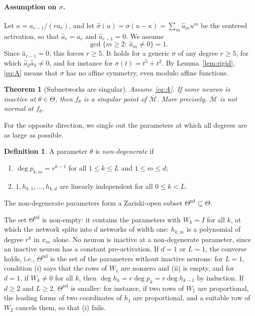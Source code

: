 \documentclass[11pt]{article}
\newtheorem{maintheorem}{Theorem}
\theoremstyle{definition}
\newtheorem{definition}[lemma]{Definition}
\theoremstyle{remark}
\newcommand{\M}{\mathcal{M}}
\newcommand{\Mbar}{\overline{\M}}
\newcommand{\Tn}{\Theta^{\mathrm{nd}}}
\newcommand{\hs}{\hat\sigma}
\newcommand{\ha}{\hat a}
\begin{document}
\paragraph{Assumption on $\sigma$.} Let $\kappa=a_{r-1}/(ra_r)$, and let $\hs(u)=\sigma(u-\kappa)=\sum_m\ha_mu^m$ be the centered activation, so that $\ha_r=a_r$ and $\ha_{r-1}=0$. We assume
\begin{equation*}\tag{A}\label{eq:A}
\gcd\{m\ge2:\ \ha_m\ne0\}=1.
\end{equation*}
Since $\ha_{r-1}=0$, this forces $r\ge5$. It holds for a generic $\sigma$ of any degree $r\ge5$, for which $\ha_2\ha_3\ne0$, and for instance for $\sigma(t)=t^5+t^2$. By Lemma~\ref{lem:rigid}, \eqref{eq:A} means that $\sigma$ has no affine symmetry, even modulo affine functions.

\begin{maintheorem}[Subnetworks are singular]\label{thm:sing}
Assume \eqref{eq:A}. If some neuron is inactive at $\theta\in\Theta$, then $f_\theta$ is a singular point of $\Mbar$. More precisely, $\Mbar$ is not normal at $f_\theta$.
\end{maintheorem}

For the opposite direction, we single out the parameters at which all degrees are as large as possible.

\begin{definition}\label{def:nd}
A parameter $\theta$ is \emph{non-degenerate} if
\begin{enumerate}[label=\textup{(\roman*)},nosep]
\item $\deg p_{k,m}=r^{k-1}$ for all $1\le k\le L$ and $1\le m\le d$;
\item $1,h_{k,1},\dots,h_{k,d}$ are linearly independent for all $0\le k<L$.
\end{enumerate}
The non-degenerate parameters form a Zariski-open subset $\Tn\subseteq\Theta$.
\end{definition}

The set $\Tn$ is non-empty: it contains the parameters with $W_k=I$ for all $k$, at which the network splits into $d$ networks of width one: $h_{k,m}$ is a polynomial of degree $r^k$ in $x_m$ alone. No neuron is inactive at a non-degenerate parameter, since an inactive neuron has a constant pre-activation. If $d=1$ or $L=1$, the converse holds, i.e., $\Tn$ is the set of the parameters without inactive neurons: for $L=1$, condition (i) says that the rows of $W_1$ are nonzero and (ii) is empty, and for $d=1$, if $W_k\ne0$ for all $k$, then $\deg h_k=r\deg p_k=r\deg h_{k-1}$ by induction. If $d\ge2$ and $L\ge2$, $\Tn$ is smaller: for instance, if two rows of $W_1$ are proportional, the leading forms of two coordinates of $h_1$ are proportional, and a suitable row of $W_2$ cancels them, so that (i) fails.
\end{document}
